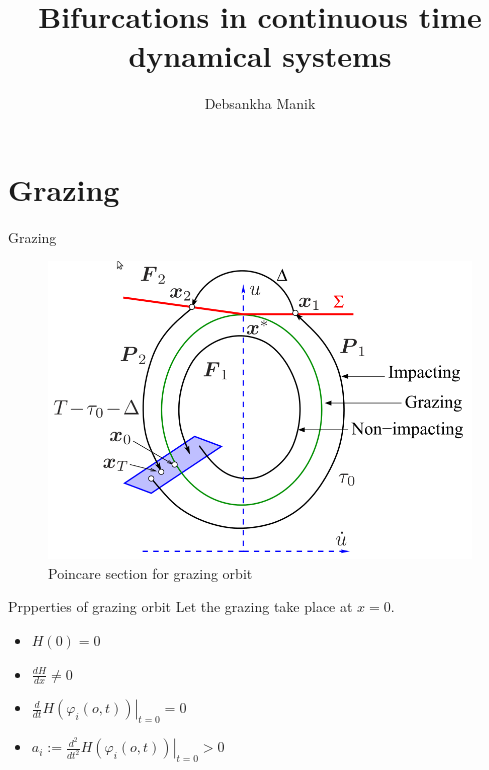 \documentclass[xcolor=x11names,compress]{beamer}
\renewcommand{\(}{\begin{columns}}
\renewcommand{\)}{\end{columns}}
\newcommand{\<}[1]{\begin{column}{#1}}
\renewcommand{\>}{\end{column}}
\begin{document}
\title{Bifurcations in continuous time dynamical systems}
\author{Debsankha Manik}

\begin{frame}


\titlepage

\end{frame}


\section{Grazing}

\begin{frame}{Grazing}

\begin{figure}
\caption{Poincare section for grazing orbit}
\begin{center}
\includegraphics[height=0.7\textheight]{graz}
\end{center}
\end{figure}
\end{frame}

\begin{frame}{Prpperties of grazing orbit}
Let the grazing take place at $x=0$.  
\begin{itemize}
\item $H(0)=0$
\item $\frac{dH}{dx}\neq 0$
\item $\frac{d}{dt}\left.  H(\varphi_i(o,t))\right|_{t=0}=0$
\item $a_i:=\frac{d^2}{dt^2}\left.  H(\varphi_i(o,t))\right|_{t=0}>0$
\end{itemize}
\end{frame}
\end{document}
